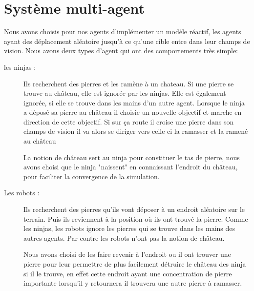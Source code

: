 \section{Système multi-agent}
\thispagestyle{fancy}

Nous avons choisis pour nos agents d'implémenter un modèle réactif,
les agents ayant des déplacement aléatoire jusqu'à ce qu'une cible
entre dans leur champs de vision. Nous avons deux types d'agent qui
ont des comportements très simple:

\begin{description}
\item[les ninjas :] 
  Ils recherchent des pierres et les ramène à un
  chateau. Si une pierre se trouve au château, elle est ignorée par
  les ninjas. Elle est également ignorée, si elle se trouve dans les
  mains d'un autre agent.
  Lorsque le ninja a déposé sa pierre au château il choisie un nouvelle objectif et marche en direction de cette objectif. Si sur ça route il croise une pierre dans son champs de vision il va alors se diriger vers celle ci la ramasser et la ramené au château
  
  La notion de château sert au ninja pour constituer le tas de pierre, nous avons choisi que le ninja "naissent" en connaissant l'endroit du château, pour faciliter la convergence de la simulation.
\item[Les robots :]
  Ils recherchent des pierres qu'ils vont déposer à un
  endroit aléatoire sur le terrain. Puis ils reviennent à la position où ils ont trouvé la pierre. Comme les ninjas, les robots ignore les pierres qui se
  trouve dans les mains des autres agents. Par contre les robots
  n'ont pas la notion de château.
  
  Nous avons choisi de les faire revenir à l'endroit ou il ont trouver une pierre pour leur permettre de plus facilement détruire le château des ninja si il le trouve, en effet cette endroit ayant une concentration de pierre importante lorsqu'il y retournera il trouvera une autre pierre à ramasser.
\end{description}


